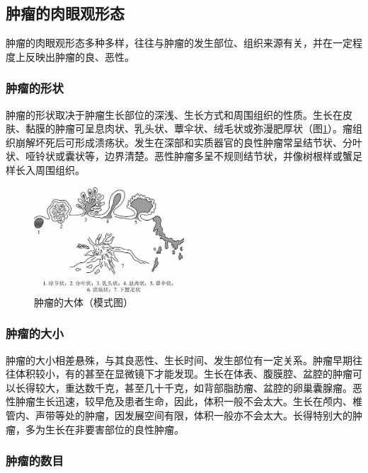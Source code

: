 \subsection{肿瘤的肉眼观形态}

肿瘤的肉眼观形态多种多样，往往与肿瘤的发生部位、组织来源有关，并在一定程度上反映出肿瘤的良、恶性。

\subsubsection{肿瘤的形状}

肿瘤的形状取决于肿瘤生长部位的深浅、生长方式和周围组织的性质。生长在皮肤、黏膜的肿瘤可呈息肉状、乳头状、蕈伞状、绒毛状或弥漫肥厚状（图\ref{fig5-1}）。瘤组织崩解坏死后可形成溃疡状。发生在深部和实质器官的良性肿瘤常呈结节状、分叶状、哑铃状或囊状等，边界清楚。恶性肿瘤多呈不规则结节状，并像树根样或蟹足样长入周围组织。

\begin{figure}[!htbp]
  \centering
  \includegraphics[width=0.5\textwidth]{./images/Image00068.jpg}
  \caption{肿瘤的大体（模式图）}
  \label{fig5-1}
\end{figure}

\subsubsection{肿瘤的大小}

肿瘤的大小相差悬殊，与其良恶性、生长时间、发生部位有一定关系。肿瘤早期往往体积较小，有的甚至在显微镜下才能发现。生长在体表、腹膜腔、盆腔的肿瘤可以长得较大，重达数千克，甚至几十千克，如背部脂肪瘤、盆腔的卵巢囊腺瘤。恶性肿瘤生长迅速，较早危及患者生命，因此，体积一般不会太大。生长在颅内、椎管内、声带等处的肿瘤，因发展空间有限，体积一般亦不会太大。长得特别大的肿瘤，多为生长在非要害部位的良性肿瘤。

\subsubsection{肿瘤的数目}

